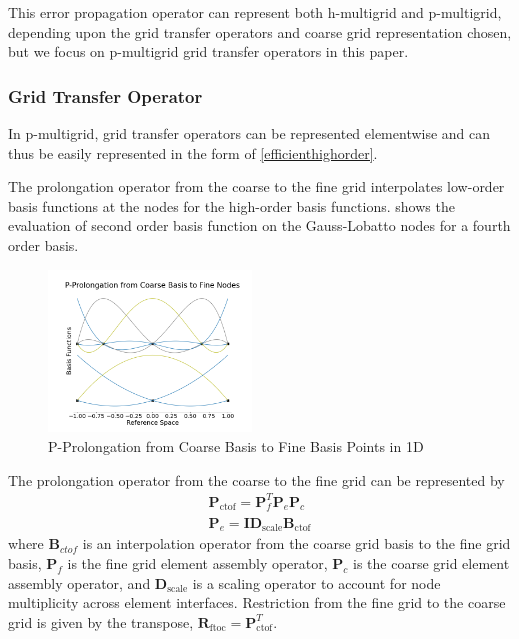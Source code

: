\documentclass[review]{siamart190516}
\begin{document}
This error propagation operator can represent both h-multigrid and p-multigrid, depending upon the grid transfer operators and coarse grid representation chosen, but we focus on p-multigrid grid transfer operators in this paper.

\subsubsection{Grid Transfer Operator}\label{sec:grids}

In p-multigrid, grid transfer operators can be represented elementwise and can thus be easily represented in the form of \cref{efficienthighorder}.

The prolongation operator from the coarse to the fine grid interpolates low-order basis functions at the nodes for the high-order basis functions.
 shows the evaluation of second order basis function on the Gauss-Lobatto nodes for a fourth order basis.

\begin{figure}[!ht]
  \centering
  \includegraphics[width=0.48\textwidth]{img/pProlongation}
  \caption{P-Prolongation from Coarse Basis to Fine Basis Points in 1D}
  \label{fig:p_prolongation}
\end{figure}

The prolongation operator from the coarse to the fine grid can be represented by
\begin{equation}
\begin{split}
\mathbf{P}_{\text{ctof}} = \mathbf{P}_f^T \mathbf{P}_e \mathbf{P}_c\\
\mathbf{P}_e = \mathbf{I} \mathbf{D}_{\text{scale}} \mathbf{B}_{\text{ctof}}
\end{split}
\end{equation}
where $\mathbf{B}_{ctof}$ is an interpolation operator from the coarse grid basis to the fine grid basis, $\mathbf{P}_f$ is the fine grid element assembly operator, $\mathbf{P}_c$ is the coarse grid element assembly operator, and $\mathbf{D}_{\text{scale}}$ is a scaling operator to account for node multiplicity across element interfaces.
Restriction from the fine grid to the coarse grid is given by the transpose, $\mathbf{R}_{\text{ftoc}} = \mathbf{P}_{\text{ctof}}^T$.
\end{document}
